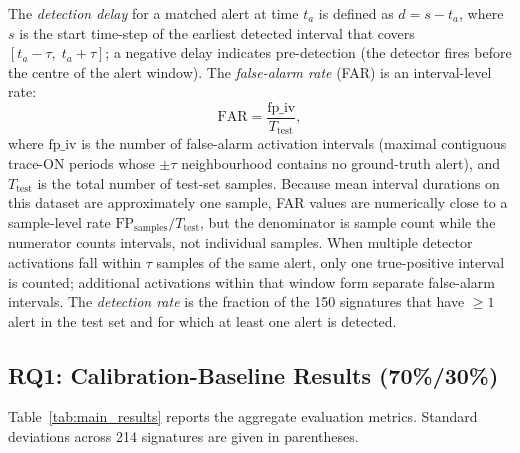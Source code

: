 \documentclass[pdflatex,sn-nature]{sn-jnl}
\theoremstyle{thmstyleone}%
\begin{document}
The \emph{detection delay} for a matched alert at time $t_a$ is defined as
$d = s - t_a$, where $s$ is the start time-step of the earliest detected
interval that covers $[t_a - \tau,\; t_a + \tau]$; a negative delay indicates
pre-detection (the detector fires before the centre of the alert window).
The \emph{false-alarm rate} (FAR) is an interval-level rate:
\begin{equation*}
  \text{FAR} = \frac{\text{fp\_iv}}{T_{\text{test}}},
\end{equation*}
where $\text{fp\_iv}$ is the number of false-alarm activation intervals
(maximal contiguous trace-ON periods whose $\pm\tau$ neighbourhood contains
no ground-truth alert), and $T_{\text{test}}$ is the total number of test-set
samples.  Because mean interval durations on this dataset are approximately
one sample, FAR values are numerically close to a sample-level rate
$\text{FP}_{\text{samples}}/T_{\text{test}}$, but the denominator is sample
count while the numerator counts intervals, not individual samples.
When multiple detector activations fall within $\tau$ samples of the same
alert, only one true-positive interval is counted; additional activations within
that window form separate false-alarm intervals.
The \emph{detection rate} is the fraction of the 150 signatures that have
$\geq 1$ alert in the test set and for which at least one alert is detected.

\subsection{RQ1: Calibration-Baseline Results (70\%/30\%)}\label{sec:largescale:RQ1}

\noindent{}

\medskip
Table~\ref{tab:main_results} reports the aggregate evaluation metrics.
Standard deviations across 214 signatures are given in parentheses.
\end{document}
